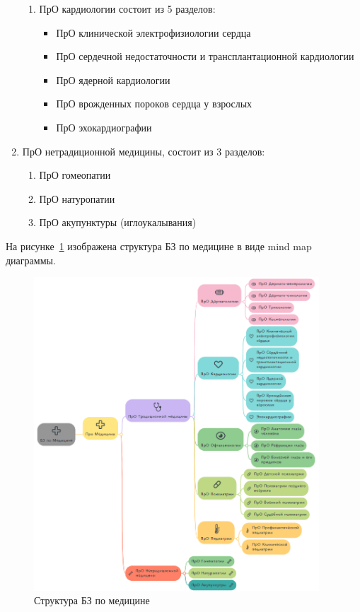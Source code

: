 \begin{enumerate}
\begin{enumerate}
		\item ПрО кардиологии состоит из 5 разделов:
		\begin{itemize}
			\item ПрО клинической электрофизиологии сердца
			\item ПрО сердечной недостаточности и трансплантационной кардиологии
			\item ПрО ядерной кардиологии
			\item ПрО врожденных пороков сердца у взрослых
			\item ПрО эхокардиографии\\
		\end{itemize}
	\end{enumerate}
	\item ПрО нетрадиционной медицины, состоит из 3 разделов:
	\begin{enumerate}
		\item ПрО гомеопатии
		\item ПрО натуропатии
		\item ПрО акупунктуры (иглоукалывания)\\
		\end{enumerate}
\end{enumerate}
На рисунке~\ref{fig:sections/map} изображена структура БЗ по медицине в виде mind map диаграммы.
\begin{figure}[H]
	\centering
	\includegraphics[width=0.95\textwidth]{sections/map.jpeg}
	\caption{Структура БЗ по медицине}
	\label{fig:sections/map}
\end{figure}
